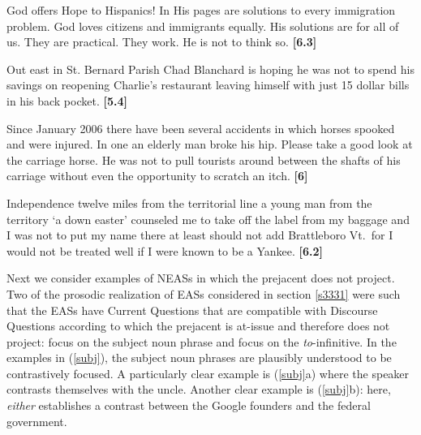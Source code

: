 \documentclass[11pt,fleqn]{article}
\newcommand{\6}{\mbox{$[\hspace*{-.6mm}[$}}
\newcommand{\9}{\mbox{$]\hspace*{-.6mm}]$}}
\begin{document}
\begin{exe}
\ex\label{ex1b}
\begin{xlist}

\ex God offers Hope to Hispanics! In His pages are solutions to every
immigration problem. God loves citizens and immigrants equally. His
solutions are for all of us. They are practical. They work. He is not
 to think so. \hfill {\bf [6.3]}

\ex Out east in St. Bernard Parish  Chad Blanchard is hoping he was not
 to spend his savings on reopening Charlie's restaurant
leaving himself with just 15 dollar bills in his back pocket. \hfill
{\bf [5.4]}




\ex Since January 2006  there have been several accidents in which
horses spooked and were injured. In one an elderly man broke his hip.
Please take a good look at the carriage horse. He was not 
to pull tourists around between the shafts of his carriage without even
the opportunity to scratch an itch. \hfill {\bf [6]}


\ex Independence  twelve miles from the territorial line  a young man
from the territory  `a down easter'  counseled me to take off the label
from my baggage  and I was not  to put my name there  at
least should not add Brattleboro  Vt.\  for I would not be treated well
if I were known to be a Yankee. \hfill \hfill {\bf [6.2]}

\end{xlist}
\end{exe}

Next we consider examples of NEASs in which the prejacent does not project. Two of the prosodic realization of EASs considered in section \ref{s3331} were such that the EASs have Current Questions that are compatible with Discourse Questions according to which the prejacent is at-issue and therefore does not project: focus on the subject noun phrase and focus on the {\em to}-infinitive. In the examples in (\ref{subj}), the subject noun phrases are plausibly understood to be contrastively focused. A particularly clear example is (\ref{subj}a) where the speaker contrasts themselves with the uncle. Another clear example is (\ref{subj}b): here, {\em either} establishes a contrast between the Google founders and the federal government.
\end{document}
